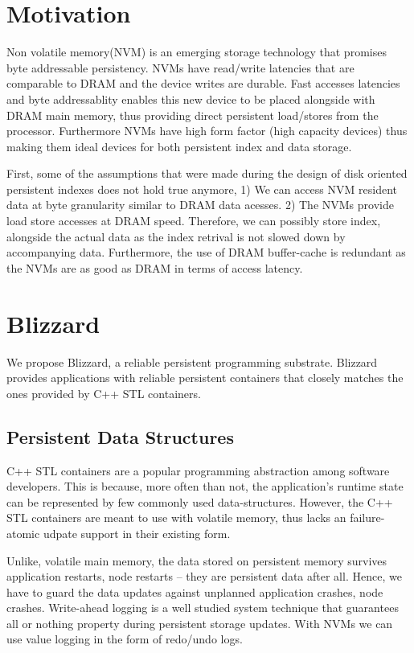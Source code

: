 \section{Motivation}
Non volatile memory(NVM) is an emerging storage technology that promises byte addressable 
persistency. NVMs have read/write latencies that are comparable to DRAM and the device 
writes are durable. Fast accesses latencies and byte addressablity enables this new device
to be placed alongside with DRAM main memory, thus providing direct persistent load/stores
from the processor. Furthermore NVMs have high form factor (high capacity devices) thus
making them ideal devices for both persistent index and data storage. 


First, some of the assumptions that were made during the design of disk oriented persistent
indexes does not hold true anymore, 1) We can access NVM resident data at byte granularity similar to
DRAM data acesses. 2) The NVMs provide load store accesses at DRAM speed. Therefore, we can
possibly store index, alongside the actual data as the index retrival is not slowed down by
accompanying data. Furthermore, the use of DRAM buffer-cache is redundant as the NVMs are 
as good as DRAM in terms of access latency.


\section{Blizzard}

We propose Blizzard, a reliable persistent programming substrate. Blizzard provides applications
with reliable persistent containers that closely matches the ones provided by C++ STL containers.

\subsection{Persistent Data Structures}

C++ STL containers are a popular programming abstraction among software developers. This is because,
more often than not, the application's runtime state can be represented by few commonly used 
data-structures.  However, the C++ STL containers are meant to use with volatile memory, thus
lacks an failure-atomic udpate support in their existing form.

Unlike, volatile main memory, the data stored on persistent memory survives application restarts,
node restarts -- they are persistent data after all. Hence, we have to guard the data updates 
against unplanned application crashes, node crashes. Write-ahead logging is a well studied
system technique that guarantees all or nothing property during persistent storage updates.
With NVMs we can use value logging in the form of redo/undo logs.


